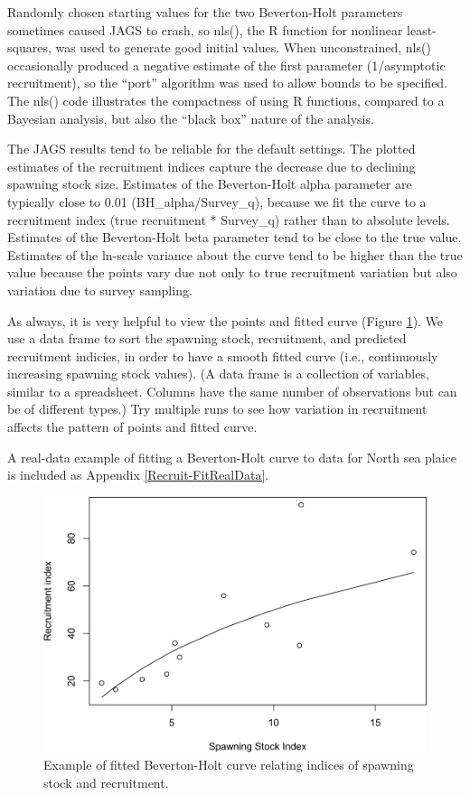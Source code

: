 \documentclass[
]{krantz}
\begin{document}
Randomly chosen starting values for the two Beverton-Holt parameters sometimes caused JAGS to crash, so nls(), the R function for nonlinear least-squares, was used to generate good initial values. When unconstrained, nls() occasionally produced a negative estimate of the first parameter (1/asymptotic recruitment), so the ``port'' algorithm was used to allow bounds to be specified. The nls() code illustrates the compactness of using R functions, compared to a Bayesian analysis, but also the ``black box'' nature of the analysis.

The JAGS results tend to be reliable for the default settings. The plotted estimates of the recruitment indices capture the decrease due to declining spawning stock size. Estimates of the Beverton-Holt alpha parameter are typically close to 0.01 (BH\_alpha/Survey\_q), because we fit the curve to a recruitment index (true recruitment * Survey\_q) rather than to absolute levels. Estimates of the Beverton-Holt beta parameter tend to be close to the true value. Estimates of the ln-scale variance about the curve tend to be higher than the true value because the points vary due not only to true recruitment variation but also variation due to survey sampling.

As always, it is very helpful to view the points and fitted curve (Figure \ref{fig:SRRPlot}). We use a data frame to sort the spawning stock, recruitment, and predicted recruitment indicies, in order to have a smooth fitted curve (i.e., continuously increasing spawning stock values). (A data frame is a collection of variables, similar to a spreadsheet. Columns have the same number of observations but can be of different types.) Try multiple runs to see how variation in recruitment affects the pattern of points and fitted curve.

A real-data example of fitting a Beverton-Holt curve to data for North sea plaice is included as Appendix \ref{Recruit-FitRealData}.

\begin{figure}
\includegraphics[width=0.9\linewidth]{bookdown_files/figure-latex/SRRPlot-1} \caption{Example of fitted Beverton-Holt curve relating indices of spawning stock and recruitment.}\label{fig:SRRPlot}
\end{figure}
\end{document}

